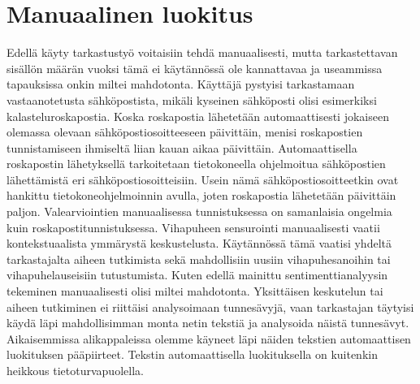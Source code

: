 \section{Manuaalinen luokitus}

Edellä käyty tarkastustyö voitaisiin tehdä manuaalisesti, mutta tarkastettavan sisällön määrän vuoksi tämä ei käytännössä ole kannattavaa ja useammissa tapauksissa onkin miltei mahdotonta. Käyttäjä pystyisi tarkastamaan vastaanotetusta sähköpostista, mikäli kyseinen sähköposti olisi esimerkiksi kalasteluroskapostia. Koska roskapostia lähetetään automaattisesti jokaiseen olemassa olevaan sähköpostiosoitteeseen päivittäin, menisi roskapostien tunnistamiseen ihmiseltä liian kauan aikaa päivittäin. Automaattisella roskapostin lähetyksellä tarkoitetaan tietokoneella ohjelmoitua sähköpostien lähettämistä eri sähköpostiosoitteisiin. Usein nämä sähköpostiosoitteetkin ovat hankittu tietokoneohjelmoinnin avulla, joten roskapostia lähetetään päivittäin paljon. Valearviointien manuaalisessa tunnistuksessa on samanlaisia ongelmia kuin roskapostitunnistuksessa. Vihapuheen sensurointi manuaalisesti vaatii kontekstuaalista ymmärystä keskustelusta. Käytännössä tämä vaatisi yhdeltä tarkastajalta aiheen tutkimista sekä mahdollisiin uusiin vihapuhesanoihin tai vihapuhelauseisiin tutustumista. Kuten edellä mainittu sentimenttianalyysin tekeminen manuaalisesti olisi miltei mahdotonta. Yksittäisen keskutelun tai aiheen tutkiminen ei riittäisi analysoimaan tunnesävyjä, vaan tarkastajan täytyisi käydä läpi mahdollisimman monta netin tekstiä ja analysoida näistä tunnesävyt. Aikaisemmissa alikappaleissa olemme käyneet läpi näiden tekstien automaattisen luokituksen pääpiirteet. Tekstin automaattisella luokituksella on kuitenkin heikkous tietoturvapuolella.